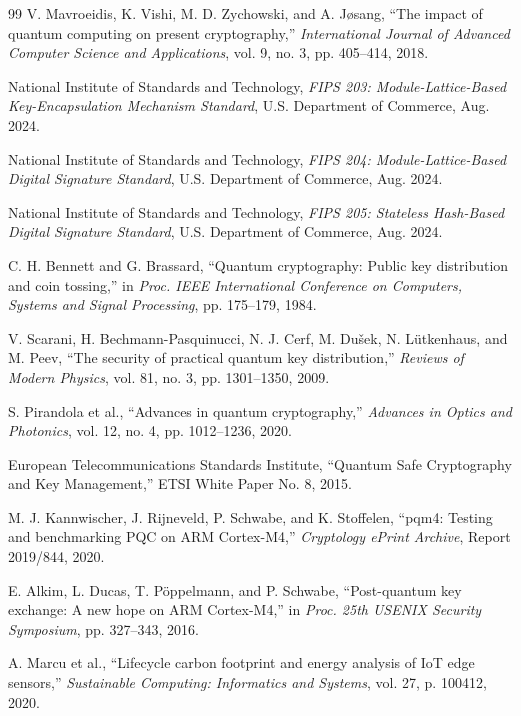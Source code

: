 \documentclass[journal]{IEEEtran}
\begin{document}
\begin{thebibliography}{99}
V. Mavroeidis, K. Vishi, M. D. Zychowski, and A. J{\o}sang,
``The impact of quantum computing on present cryptography,''
\emph{International Journal of Advanced Computer Science and Applications}, vol. 9, no. 3, pp. 405--414, 2018.

National Institute of Standards and Technology,
\emph{FIPS 203: Module-Lattice-Based Key-Encapsulation Mechanism Standard},
U.S. Department of Commerce, Aug. 2024.

National Institute of Standards and Technology,
\emph{FIPS 204: Module-Lattice-Based Digital Signature Standard},
U.S. Department of Commerce, Aug. 2024.

National Institute of Standards and Technology,
\emph{FIPS 205: Stateless Hash-Based Digital Signature Standard},
U.S. Department of Commerce, Aug. 2024.

C. H. Bennett and G. Brassard,
``Quantum cryptography: Public key distribution and coin tossing,''
in \emph{Proc. IEEE International Conference on Computers, Systems and Signal Processing}, pp. 175--179, 1984.

V. Scarani, H. Bechmann-Pasquinucci, N. J. Cerf, M. Du\v{s}ek, N. L\"utkenhaus, and M. Peev,
``The security of practical quantum key distribution,''
\emph{Reviews of Modern Physics}, vol. 81, no. 3, pp. 1301--1350, 2009.

S. Pirandola et al.,
``Advances in quantum cryptography,''
\emph{Advances in Optics and Photonics}, vol. 12, no. 4, pp. 1012--1236, 2020.

European Telecommunications Standards Institute,
``Quantum Safe Cryptography and Key Management,''
ETSI White Paper No. 8, 2015.

M. J. Kannwischer, J. Rijneveld, P. Schwabe, and K. Stoffelen,
``pqm4: Testing and benchmarking PQC on ARM Cortex-M4,''
\emph{Cryptology ePrint Archive}, Report 2019/844, 2020.

E. Alkim, L. Ducas, T. P{\"o}ppelmann, and P. Schwabe,
``Post-quantum key exchange: A new hope on ARM Cortex-M4,''
in \emph{Proc. 25th USENIX Security Symposium}, pp. 327--343, 2016.

A. Marcu et al.,
``Lifecycle carbon footprint and energy analysis of IoT edge sensors,''
\emph{Sustainable Computing: Informatics and Systems}, vol. 27, p. 100412, 2020.


\end{thebibliography}
\end{document}
